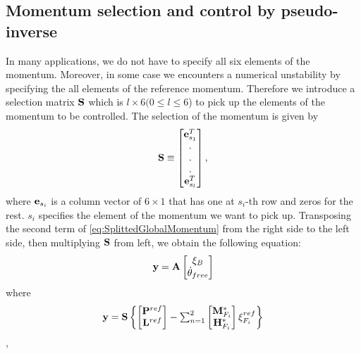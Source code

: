 \subsection{Momentum selection and control by pseudo-inverse}
In many applications, we do not have to specify all six elements of the momentum.
Moreover, in some case we encounters a numerical unstability by specifying the all
elements of the reference momentum.
Therefore we introduce a selection matrix ${\bf S}$ which is $l\times 6 (0 \le l \leq 6 $)
to pick up the elements of the momentum to be controlled. The selection of the momentum
is given by 
\begin{equation}
{\bf S} \equiv 
\left[
\begin{matrix}
{\bf e}^T_{s_1} \\
. \\
. \\
.\\
{\bf e}^T_{s_l} \\
\end{matrix}
\right],
\end{equation}
where ${\bf e}_{s_i}$ is a column vector of $6 \times 1$ that has one at $s_i$-th row 
and zeros for the rest. $s_i$ specifies the element of the momentum we want to pick up.
Transposing the second term of \ref{eq:SplittedGlobalMomentum} from the right side to 
the left side, then multiplying ${\bf S}$ from left, we obtain the following equation:
\begin{equation}
{\bf y} = {\bf A} 
\left[
\begin{matrix}
\xi_{B}\\
\dot{\theta}_{free}\\
\end{matrix}
\right]
\label{eq:TheLinearSystem}
\end{equation}
where
\begin{equation}
{\bf y} = {\bf S}
\left\{
\begin{matrix}
\left[
\begin{matrix}
{\bf P}^{ref} \\
{\bf L}^{ref} \\
\end{matrix}
\right]
-
\sum^{2}_{n=1}
\left[
\begin{matrix}
{\bf M}^*_{F_i} \\
{\bf H}^*_{F_i} \\
\end{matrix}
\right]
\xi^{ref}_{F_i}
\end{matrix}
\right\}
\end{equation},
